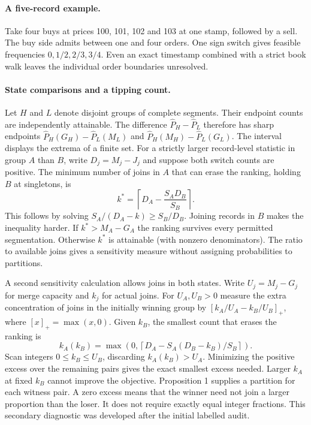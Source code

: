 \documentclass[11pt]{article}
\newcommand{\Prs}{\widehat P}
\begin{document}
\paragraph{A five-record example.}
Take four buys at prices 100, 101, 102 and 103 at one stamp, followed by a sell. The buy side admits between one and four orders. One sign switch gives feasible frequencies $0,1/2,2/3,3/4$. Even an exact timestamp combined with a strict book walk leaves the individual order boundaries unresolved.

\paragraph{State comparisons and a tipping count.}
Let $H$ and $L$ denote disjoint groups of complete segments. Their endpoint counts are independently attainable. The difference $\Prs_H-\Prs_L$ therefore has sharp endpoints $\Prs_H(G_H)-\Prs_L(M_L)$ and $\Prs_H(M_H)-\Prs_L(G_L)$. The interval displays the extrema of a finite set. For a strictly larger record-level statistic in group $A$ than $B$, write $D_j=M_j-J_j$ and suppose both switch counts are positive. The minimum number of joins in $A$ that can erase the ranking, holding $B$ at singletons, is
\begin{equation}
 k^*=\left\lceil D_A-\frac{S_A D_B}{S_B}\right\rceil.\label{eq:k}
\end{equation}
This follows by solving $S_A/(D_A-k)\geq S_B/D_B$. Joining records in $B$ makes the inequality harder. If $k^*>M_A-G_A$ the ranking survives every permitted segmentation. Otherwise $k^*$ is attainable (with nonzero denominators). The ratio to available joins gives a sensitivity measure without assigning probabilities to partitions.

A second sensitivity calculation allows joins in both states. Write $U_j=M_j-G_j$ for merge capacity and $k_j$ for actual joins. For $U_A,U_B>0$ measure the extra concentration of joins in the initially winning group by $[k_A/U_A-k_B/U_B]_+$, where $[x]_+=\max(x,0)$. Given $k_B$, the smallest count that erases the ranking is
\[
 k_A(k_B)=\max\!\left(0,\left\lceil D_A- S_A(D_B-k_B)/S_B\right\rceil\right).
\]
Scan integers $0\leq k_B\leq U_B$, discarding $k_A(k_B)>U_A$. Minimizing the positive excess over the remaining pairs gives the exact smallest excess needed. Larger $k_A$ at fixed $k_B$ cannot improve the objective. Proposition 1 supplies a partition for each witness pair. A zero excess means that the winner need not join a larger proportion than the loser. It does not require exactly equal integer fractions. This secondary diagnostic was developed after the initial labelled audit.
\end{document}
